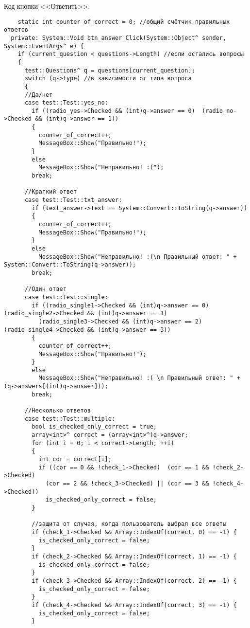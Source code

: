 Код кнопки <<Ответить>>:
\begin{verbatim}
    static int counter_of_correct = 0; //общий счётчик правильных ответов
  private: System::Void btn_answer_Click(System::Object^ sender, System::EventArgs^ e) {
    if (current_question < questions->Length) //если остались вопросы
    {
      test::Questions^ q = questions[current_question];
      switch (q->type) //в зависимости от типа вопроса
      {
      //Да/нет
      case test::Test::yes_no:
        if ((radio_yes->Checked && (int)q->answer == 0)  (radio_no->Checked && (int)q->answer == 1))
        {
          counter_of_correct++;
          MessageBox::Show("Правильно!");
        }
        else
          MessageBox::Show("Неправильно! :(");
        break;

      //Краткий ответ
      case test::Test::txt_answer:
        if (text_answer->Text == System::Convert::ToString(q->answer))
        {
          counter_of_correct++;
          MessageBox::Show("Правильно!");
        }
        else
          MessageBox::Show("Неправильно! :(\n Правильный ответ: " + System::Convert::ToString(q->answer));
        break;

      //Один ответ
      case test::Test::single:
        if ((radio_single1->Checked && (int)q->answer == 0)  (radio_single2->Checked && (int)q->answer == 1) 
          (radio_single3->Checked && (int)q->answer == 2)  (radio_single4->Checked && (int)q->answer == 3))
        {
          counter_of_correct++;
          MessageBox::Show("Правильно!");
        }
        else
          MessageBox::Show("Неправильно! :( \n Правильный ответ: " + (q->answers[(int)q->answer]));
        break;

      //Несколько ответов
      case test::Test::multiple:
        bool is_checked_only_correct = true;
        array<int>^ correct = (array<int>^)q->answer;
        for (int i = 0; i < correct->Length; ++i)
        {
          int cor = correct[i];
          if ((cor == 0 && !check_1->Checked)  (cor == 1 && !check_2->Checked) 
            (cor == 2 && !check_3->Checked) || (cor == 3 && !check_4->Checked))
            is_checked_only_correct = false;
        }

        //защита от случая, когда пользователь выбрал все ответы
        if (check_1->Checked && Array::IndexOf(correct, 0) == -1) {
          is_checked_only_correct = false;
        }
        if (check_2->Checked && Array::IndexOf(correct, 1) == -1) {
          is_checked_only_correct = false;
        }
        if (check_3->Checked && Array::IndexOf(correct, 2) == -1) {
          is_checked_only_correct = false;
        }
        if (check_4->Checked && Array::IndexOf(correct, 3) == -1) {
          is_checked_only_correct = false;
        }


\end{verbatim}
